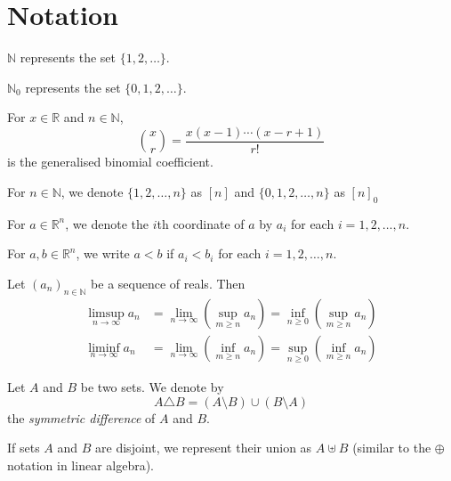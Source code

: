 \section{Notation}

$\mathbb{N}$ represents the set $\{1,2,\ldots\}$.

\vspace{1mm}
$\mathbb{N}_0$ represents the set $\{0,1,2,\ldots\}$.

\vspace{1mm}
For $x\in\mathbb{R}$ and $n\in\mathbb{N}$,
$$\binom{x}{r}=\frac{x(x-1)\cdots(x-r+1)}{r!}$$
is the generalised binomial coefficient.

\vspace{2mm}
For $n\in\mathbb{N}$, we denote $\{1,2,\ldots,n\}$ as $[n]$ and $\{0,1,2,\ldots,n\}$ as $[n]_0$

\vspace{2mm}
For $a\in\mathbb{R}^n$, we denote the $i$th coordinate of $a$ by $a_i$ for each $i=1,2,\ldots,n$.

\vspace{1mm}
For $a,b\in\mathbb{R}^n$, we write $a<b$ if $a_i<b_i$ for each $i=1,2,\ldots,n$.

\vspace{2mm}
Let $(a_n)_{n\in\mathbb{N}}$ be a sequence of reals. Then
\begin{align*}
    \limsup_{n\to\infty}a_n &= \lim_{n\to\infty}\left(\sup_{m\geq n}a_n\right) =    \inf_{n\geq 0}\left(\sup_{m\geq n}a_n\right) \\
    \liminf_{n\to\infty}a_n &= \lim_{n\to\infty}\left(\inf_{m\geq n}a_n\right) =    \sup_{n\geq 0}\left(\inf_{m\geq n}a_n\right)
\end{align*}

\vspace{2mm}
Let $A$ and $B$ be two sets. We denote by
$$A\triangle B=(A\setminus B)\cup(B\setminus A)$$
the \textit{symmetric difference} of $A$ and $B$.

\vspace{2mm}
If sets $A$ and $B$ are disjoint, we represent their union as $A\uplus B$ (similar to the $\oplus$ notation in linear algebra).   


\clearpage